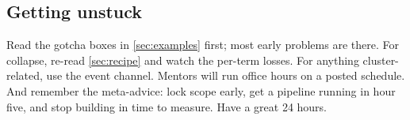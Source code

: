 \documentclass{article}
\begin{document}
\subsection{Getting unstuck}

Read the gotcha boxes in \cref{sec:examples} first; most early problems are there.
For collapse, re-read \cref{sec:recipe} and watch the per-term losses. For anything
cluster-related, use the event channel. Mentors will run office hours on a posted
schedule. And remember the meta-advice: lock scope early, get a pipeline running in
hour five, and stop building in time to measure. Have a great 24 hours.



\end{document}

